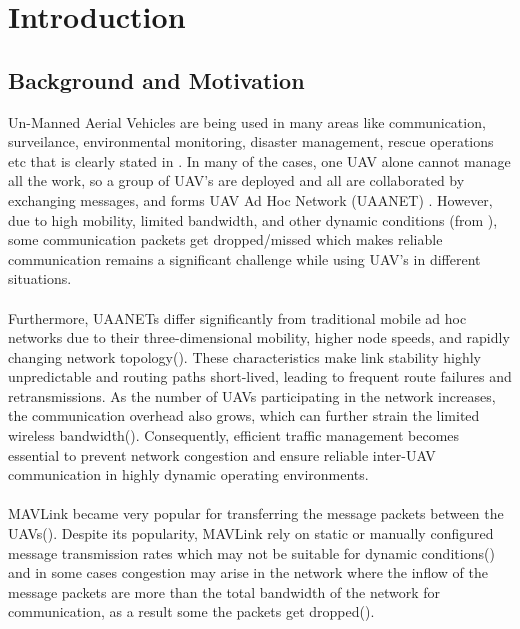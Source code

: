 \documentclass[pdflatex,sn-mathphys-num]{sn-jnl}%
\theoremstyle{thmstyleone}%
\theoremstyle{thmstyletwo}%
\theoremstyle{thmstylethree}%
\begin{document}
\maketitle

\section{ Introduction }
\subsection{ Background and Motivation }
Un-Manned Aerial Vehicles are being used in many areas like communication, surveilance, environmental monitoring, disaster management, rescue operations etc that is clearly stated in \citet{ghamari2022unmanned}. In many of the cases, one UAV alone cannot manage all the work, so a group of UAV's are deployed and all are collaborated by exchanging messages, and forms UAV Ad Hoc Network (UAANET) \citet{rovira2022review} . However, due to high mobility, limited bandwidth, and other dynamic conditions (from \citet{nawaz2021uav}), some communication packets get dropped/missed which makes reliable communication remains a significant challenge while using UAV's in different situations.\\
\\
Furthermore, UAANETs differ significantly from traditional mobile ad hoc networks due to their three-dimensional mobility, higher node speeds, and rapidly changing network topology(\citet{amponis2021survey}). These characteristics make link stability highly unpredictable and routing paths short-lived, leading to frequent route failures and retransmissions. As the number of UAVs participating in the network increases, the communication overhead also grows, which can further strain the limited wireless bandwidth(\citet{yang2022improved}). Consequently, efficient traffic management becomes essential to prevent network congestion and ensure reliable inter-UAV communication in highly dynamic operating environments.\\
\\
 MAVLink became very popular for transferring the message packets between the UAVs(\citet{cordill2025comprehensive}). Despite its popularity, MAVLink rely on static or manually configured message transmission rates which may not be suitable for dynamic conditions(\citet{lee2021enabling}) and in some cases congestion may arise in the network where the inflow of the message packets are more than the total bandwidth of the network for communication, as a result some the packets get dropped(\citet{anwekar2023analysis}).\\ 
\end{document}
